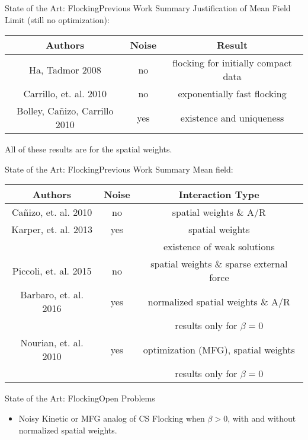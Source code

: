 \documentclass{beamer}
\begin{document}
\begin{frame}{State of the Art: Flocking}{Previous Work Summary}
	Justification of Mean Field Limit (still no optimization):
	\begin{center}
		\begin{tabular}{|c|c|c|}
			\hline
			Authors & Noise & Result  \\ \hline
			Ha, Tadmor 2008& no & flocking for initially compact data \\ \hline
			Carrillo, et. al. 2010& no & exponentially fast flocking \\ \hline
			Bolley, Ca\~nizo, Carrillo 2010 & yes& existence and uniqueness \\
			\hline
		\end{tabular}
	\end{center}
	All of these results are for the spatial weights.
\end{frame}

\begin{frame}{State of the Art: Flocking}{Previous Work Summary}
	Mean field:
	\begin{center}
		\begin{tabular}{|c|c|c|}
			\hline
			Authors & Noise & Interaction Type  \\ \hline
			Ca\~nizo, et. al. 2010& no & spatial weights \& A/R \\ \hline
			Karper, et. al. 2013& yes & spatial weights \\
			& & existence of weak solutions \\ \hline
			Piccoli, et. al. 2015& no & spatial weights \& sparse external force \\ \hline
			Barbaro, et. al. 2016& yes & normalized spatial weights \& A/R \\
			& & results only for $\beta=0$ \\ \hline
			Nourian, et. al. 2010 & yes& optimization (MFG), spatial weights \\
			& & results only for $\beta=0$ \\
			\hline
		\end{tabular}
	\end{center}
\end{frame}

\begin{frame}{State of the Art: Flocking}{Open Problems}
	\begin{itemize}
		\item {
			Noisy Kinetic or MFG analog of CS Flocking when $\beta > 0$, with and without normalized spatial weights.
		}
	\end{itemize}
\end{frame}
\end{document}
